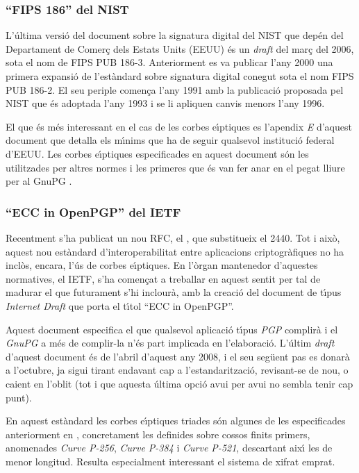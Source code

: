\documentclass[12pt,twoside,catalan,a4paper]{book}%
\numberwithin{figure}{section}		%
\theoremstyle{definition}   			%
\def\ces{corbes e\lgem{}\'{\i}ptiques}%
\def\cfs{cossos finits}%
\theoremstyle{saltolinea}   			%
\begin{document}
\subsubsection{``FIPS 186'' del NIST}
L'\'ultima versi\'o del document sobre la signatura digital del NIST que dep\'en del Departament de Comer\c{c} dels Estats Units (EEUU) \'es un \emph{draft} del mar\c{c} del 2006, sota el nom de FIPS PUB 186-3. Anteriorment es va publicar l'any 2000 una primera expansi\'o de l'est\`andard sobre signatura digital conegut sota el nom FIPS PUB 186-2. El seu periple comen\c{c}a l'any 1991 amb la publicaci\'o proposada pel NIST que \'es adoptada l'any 1993 i se li apliquen canvis menors l'any 1996.

El que \'es m\'es interessant en el cas de les \ces{} es l'apendix \emph{E} d'aquest document que detalla els m\'{\i}nims que ha de seguir qualsevol instituci\'o federal d'EEUU. Les \ces{} especificades en aquest document s\'on les utilitzades per altres normes i les primeres que \'es van fer anar en el pegat lliure per al GnuPG \cite{BM04}.

\subsubsection{``ECC in OpenPGP'' del IETF}\label{subsec:ECPGP}

Recentment s'ha publicat un nou RFC, el \cite{4880}, que substitueix el 2440. Tot i aix\`o, aquest nou est\`andard d'interoperabilitat entre aplicacions criptogr\`afiques no ha incl\`os, encara, l'\'us de \ces. En l'\`organ mantenedor d'aquestes normatives, el IETF, s'ha comen\c{c}at a treballar en aquest sentit per tal de madurar el que futurament s'hi inclour\`a, amb la creaci\'o del document de t\'{\i}pus \emph{Internet Draft} que porta el t\'{\i}tol ``ECC in OpenPGP''.

Aquest document especifica el que qualsevol aplicaci\'o t\'{\i}pus \emph{PGP} complir\`a i el \emph{GnuPG} a m\'es de complir-la n'\'es part implicada en l'elaboraci\'o. L'\'ultim \emph{draft} d'aquest document \'es de l'abril d'aquest any 2008, i el seu seg\"uent pas es donar\`a a l'octubre, ja sigui tirant endavant cap a l'estandaritzaci\'o, revisant-se de nou, o caient en l'oblit (tot i que aquesta \'ultima opci\'o avui per avui no sembla tenir cap punt).

En aquest est\`andard les \ces{} triades s\'on algunes de les especificades anteriorment en \cite{NIST186}, concretament les definides sobre \cfs{} primers, anomenades \emph{Curve P-256}, \emph{Curve P-384} i \emph{Curve P-521}, descartant aix\'{\i} les de menor longitud. Resulta especialment interessant el sistema de xifrat emprat.
\end{document}
